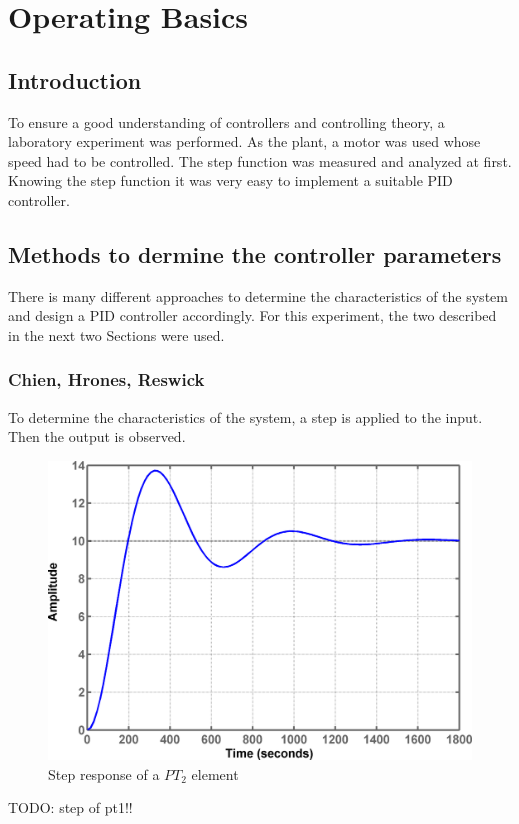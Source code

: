 \section{Operating Basics}

\subsection{Introduction}

To ensure a good understanding of controllers and controlling theory, a laboratory experiment was performed. As the plant, a motor was used whose speed had to be controlled.
The step function was measured and analyzed at first. Knowing the step function it was very easy to implement a suitable PID controller.

\subsection{Methods to dermine the controller parameters}

There is many different approaches to determine the characteristics of the system and design a PID controller accordingly. For this experiment, the two described in the next two Sections were used.

\subsubsection{Chien, Hrones, Reswick}
\label{subs:Chien, Hrones, Reswick}

To determine the characteristics of the system, a step is applied to the input. Then the output is observed.

\begin{figure}[H]
\begin{center}
\includegraphics[width=0.5\linewidth]{images/general/step_pt2}
\end{center}
\caption{Step response of a $PT_2$ element}
\label{fig:step_pt2}
\end{figure}
TODO: step of pt1!!

